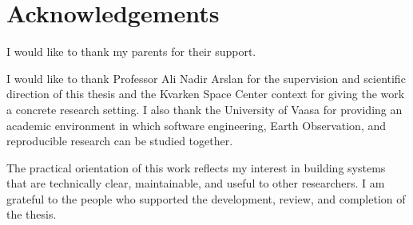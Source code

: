 \chapter*{Acknowledgements}


I would like to thank my parents for their support.

I would like to thank Professor Ali Nadir Arslan for the supervision and scientific direction of this thesis and the Kvarken Space Center context for giving the work a concrete research setting. I also thank the University of Vaasa for providing an academic environment in which software engineering, Earth Observation, and reproducible research can be studied together.

The practical orientation of this work reflects my interest in building systems that are technically clear, maintainable, and useful to other researchers. I am grateful to the people who supported the development, review, and completion of the thesis.
